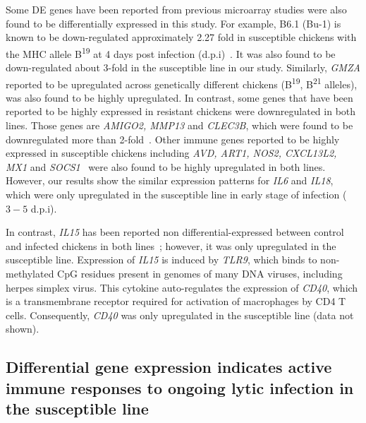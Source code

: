 \documentclass[10pt]{article}
\begin{document}
Some DE genes have been reported from previous microarray studies
were also found to be differentially expressed in this study.
For example, B6.1 (Bu-1) is known to be down-regulated
approximately 2.27 fold in susceptible chickens with the MHC
allele B\textsuperscript{19} at 4 days post infection
(d.p.i)~\cite{sarson2008transcriptional}.  It was also found to
be down-regulated about 3-fold in the susceptible line in our
study.  Similarly, {\em GMZA} reported to be upregulated across
genetically different chickens (B\textsuperscript{19},
B\textsuperscript{21} alleles), was also found to be highly
upregulated.  In contrast, some genes that have been reported to
be highly expressed in resistant chickens were downregulated in
both lines. Those genes are {\em AMIGO2, MMP13} and {\em CLEC3B},
which were found to be downregulated more than
2-fold~\cite{sarson2008transcriptional}.
Other immune genes reported to be highly expressed in susceptible
chickens including {\em AVD, ART1, NOS2, CXCL13L2, MX1} and {\em
SOCS1}~\cite{smith2011systems} were also found to be highly
upregulated in both lines.  However, our results show the similar
expression patterns for {\em IL6} and {\em IL18}, which were only
upregulated in the susceptible line in early stage of infection
($3-5$ d.p.i).

In contrast, {\em IL15} has been reported non
differential-expressed between control and infected chickens in
both lines~\cite{kaiser2003differential}; however, it was only
upregulated in the susceptible line.  Expression of {\em IL15} is
induced by {\em TLR9}, which binds to non-methylated CpG residues
present in genomes of many DNA viruses, including herpes simplex
virus.  This cytokine auto-regulates the expression of {\em
CD40}, which is a transmembrane receptor required for activation
of macrophages by CD4 T cells.  Consequently, {\em CD40} was only
upregulated in the susceptible line (data not shown).

\subsection*{Differential gene expression indicates active immune
responses to ongoing lytic infection in the susceptible line}
\end{document}
